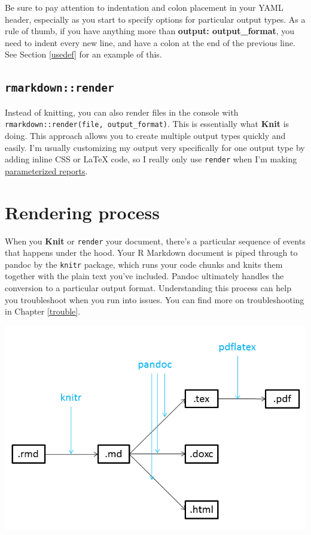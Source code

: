 \documentclass[
  openany]{book}
\begin{document}
Be sure to pay attention to indentation and colon placement in your YAML header, especially as you start to specify options for particular output types. As a rule of thumb, if you have anything more than \textbf{output: output\_format}, you need to indent every new line, and have a colon at the end of the previous line. See Section \ref{usedef} for an example of this.

\hypertarget{rmarkdownrender}{%
\subsection{\texorpdfstring{\texttt{rmarkdown::render}}{rmarkdown::render}}\label{rmarkdownrender}}

Instead of knitting, you can also render files in the console with \texttt{rmarkdown::render(file,\ output\_format)}. This is essentially what \textbf{Knit} is doing. This approach allows you to create multiple output types quickly and easily. I'm usually customizing my output very specifically for one output type by adding inline CSS or LaTeX code, so I really only use \texttt{render} when I'm making \href{https://rmarkdown.rstudio.com/developer_parameterized_reports.html\%23parameter_types\%2F}{parameterized reports}.

\hypertarget{rendering-process}{%
\section{Rendering process}\label{rendering-process}}

When you \textbf{Knit} or \texttt{render} your document, there's a particular sequence of events that happens under the hood. Your R Markdown document is piped through to pandoc by the \texttt{knitr} package, which runs your code chunks and knits them together with the plain text you've included. Pandoc ultimately handles the conversion to a particular output format. Understanding this process can help you troubleshoot when you run into issues. You can find more on troubleshooting in Chapter \ref{trouble}.

\includegraphics[width=\textwidth]{images/rendering_process}
\end{document}
